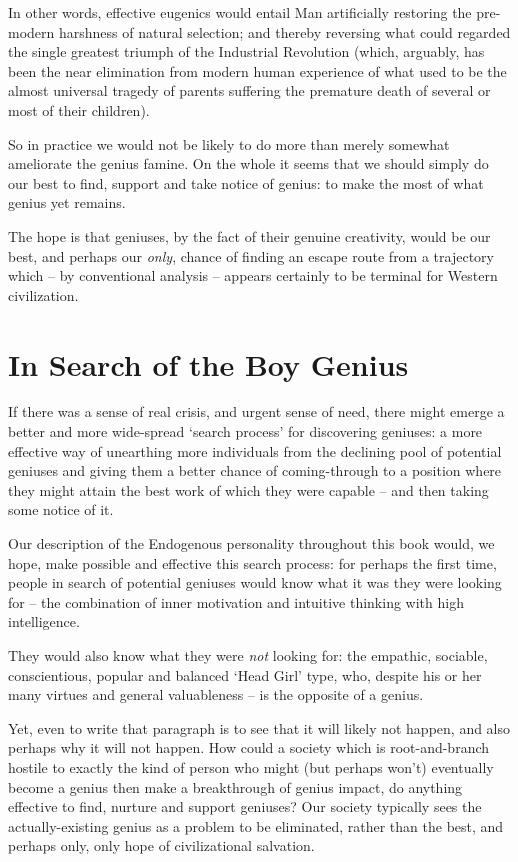 \documentclass[
]{book}
\begin{document}
In other words, effective eugenics would entail Man artificially restoring the pre-modern harshness of natural selection; and thereby reversing what could regarded the single greatest triumph of the Industrial Revolution (which, arguably, has been the near elimination from modern human experience of what used to be the almost universal tragedy of parents suffering the premature death of several or most of their children).

So in practice we would not be likely to do more than merely somewhat ameliorate the genius famine.
On the whole it seems that we should simply do our best to find, support and take notice of genius: to make the most of what genius yet remains.

The hope is that geniuses, by the fact of their genuine creativity, would be our best, and perhaps our \emph{only}, chance of finding an escape route from a trajectory which -- by conventional analysis -- appears certainly to be terminal for Western civilization.

\hypertarget{in-search-of-the-boy-genius}{%
\chapter{In Search of the Boy Genius}\label{in-search-of-the-boy-genius}}

If there was a sense of real crisis, and urgent sense of need, there might emerge a better and more wide-spread `search process' for discovering geniuses: a more effective way of unearthing more individuals from the declining pool of potential geniuses and giving them a better chance of coming-through to a position where they might attain the best work of which they were capable -- and then taking some notice of it.

Our description of the Endogenous personality throughout this book would, we hope, make possible and effective this search process: for perhaps the first time, people in search of potential geniuses would know what it was they were looking for -- the combination of inner motivation and intuitive thinking with high intelligence.

They would also know what they were \emph{not} looking for: the empathic, sociable, conscientious, popular and balanced `Head Girl' type, who, despite his or her many virtues and general valuableness -- is the opposite of a genius.

Yet, even to write that paragraph is to see that it will likely not happen, and also perhaps why it will not happen. How could a society which is root-and-branch hostile to exactly the kind of person who might (but perhaps won't) eventually become a genius then make a breakthrough of genius impact, do anything effective to find, nurture and support geniuses? Our society typically sees the actually-existing genius as a problem to be eliminated, rather than the best, and perhaps only, only hope of civilizational salvation.
\end{document}
